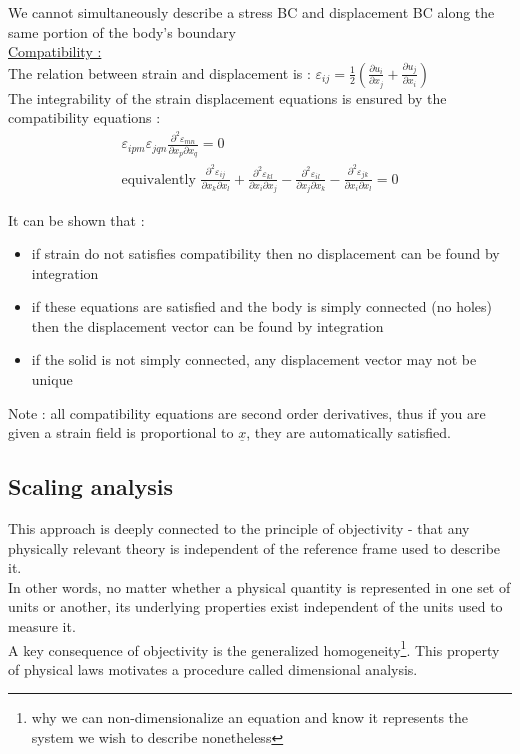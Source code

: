 \documentclass[../main.tex]{subfiles}
\begin{document}
\warning We cannot simultaneously describe a stress BC and displacement BC along the same portion of the body's boundary\\

\quad \underline{Compatibility :}\\
The relation between strain and displacement is : $\varepsilon_{ij} = \frac{1}{2}( \frac{\partial u_i}{\partial x_j} + \frac{\partial u_j}{\partial x_i})$\\

The integrability of the strain displacement equations is ensured by the compatibility equations : \\
\begin{equation}
    \begin{gathered}
        \varepsilon_{ipm} \varepsilon_{jqn} \frac{\partial^2 \varepsilon_{mn}}{\partial x_p \partial x_q} = 0\\
        \text{equivalently } \frac{\partial^2 \varepsilon_{ij}}{\partial x_k \partial x_l} + \frac{\partial^2 \varepsilon_{kl}}{\partial x_i \partial x_j} - \frac{\partial^2 \varepsilon_{il}}{\partial x_j \partial x_k} - \frac{\partial^2 \varepsilon_{jk}}{\partial x_i \partial x_l} = 0
    \end{gathered}
\end{equation}

It can be shown that : \begin{itemize}
    \item if strain do not satisfies compatibility then no displacement can be found by integration\\
    \item if these equations are satisfied and the body is simply connected (no holes) then the displacement vector can be found by integration\\
    \item if the solid is not simply connected, any displacement vector may not be unique\\
\end{itemize}

\color{gray}Note : all compatibility equations are second order derivatives, thus if you are given a strain field is proportional to $\underline{x}$, they are automatically satisfied. \color{black}\\

\subsection{Scaling analysis}
This approach is deeply connected to the principle of objectivity - that any physically relevant theory is independent of the reference frame used to describe it.\\
In other words, no matter whether a physical quantity is represented in one set of units or another, its underlying properties exist independent of the units used to measure it.\\
A key consequence of objectivity is the generalized homogeneity\footnote{why we can non-dimensionalize an equation and know it represents the system we wish to describe nonetheless}. This property of physical laws motivates a procedure called dimensional analysis.\\
\end{document}
